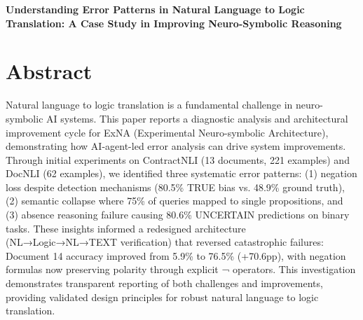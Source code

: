 \documentclass[12pt,a4paper]{article}
\begin{document}
\begin{center}
{\fontsize{18}{21.6}\selectfont\bfseries
Understanding Error Patterns in Natural Language to Logic Translation: A Case Study in Improving Neuro-Symbolic Reasoning
}
\end{center}
\vspace{12pt}


\vspace{12pt}




\section{Abstract}

Natural language to logic translation is a fundamental challenge in neuro-symbolic AI systems. This paper reports a diagnostic analysis and architectural improvement cycle for ExNA (Experimental Neuro-symbolic Architecture), demonstrating how AI-agent-led error analysis can drive system improvements. Through initial experiments on ContractNLI (13 documents, 221 examples) and DocNLI (62 examples), we identified three systematic error patterns: (1) negation loss despite detection mechanisms (80.5\% TRUE bias vs. 48.9\% ground truth), (2) semantic collapse where 75\% of queries mapped to single propositions, and (3) absence reasoning failure causing 80.6\% UNCERTAIN predictions on binary tasks. These insights informed a redesigned architecture (NL→Logic→NL→TEXT verification) that reversed catastrophic failures: Document 14 accuracy improved from 5.9\% to 76.5\% (+70.6pp), with negation formulas now preserving polarity through explicit ¬ operators. This investigation demonstrates transparent reporting of both challenges and improvements, providing validated design principles for robust natural language to logic translation.

\vspace{24pt}

\end{document}
